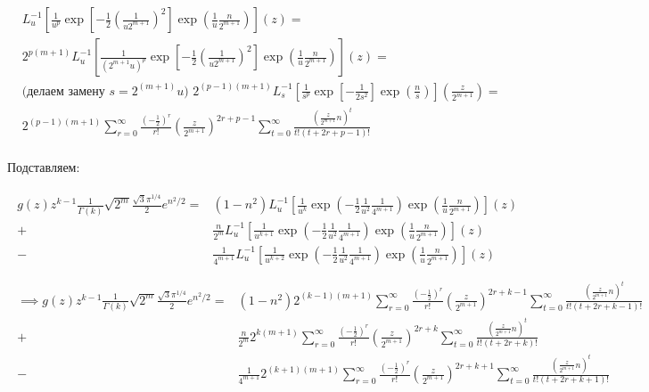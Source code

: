 \documentclass[a4paper, fleqn]{report}
\begin{document}
\begin{align*}
    & L^{-1}_u \left[ \frac{1}{u^p} \exp \left[ -\frac{1}{2} \left( \frac{1}{u 2^{m+1}} \right)^2  \right] \exp \left( \frac{1}{u} \frac{n}{2^{m+1}}\right)   \right](z) = \\
    & 2^{p(m+1)} L^{-1}_u \left[ \frac{1}{\left( 2^{m+1}u \right)^p} \exp \left[ -\frac{1}{2} \left( \frac{1}{u 2^{m+1}} \right)^2  \right] \exp \left( \frac{1}{u} \frac{n}{2^{m+1}}\right)   \right](z) = \\
    & \text{(делаем замену $s = 2^{(m+1)}u$) } 2^{(p-1)(m+1)} L^{-1}_s \left[ \frac{1}{s^p} \exp \left[ -\frac{1}{2 s^2} \right] \exp \left( \frac{n}{s} \right)  \right] \left(\frac{z}{2^{m+1}}\right) = \\
    & 2^{(p-1)(m+1)} \sum_{r=0}^{\infty} \frac{\left( -\frac{1}{2} \right)^r}{r!} \left(\frac{z}{2^{m+1}}\right)^{2r+p-1} \sum_{t=0}^{\infty} \frac{\left(\frac{z}{2^{m+1}}n\right)^{t}}{t!(t+2r+p-1)!} \\
\end{align*}

Подставляем:

\begin{align*}
\begin{split}
    g(z) z^{k-1} \frac{1}{\Gamma(k)} \sqrt{2^m} \frac{\sqrt{3} \pi^{1 /4}}{2} e^{n^2 /2} ={}& (1-n^2) L^{-1}_u \left[ \frac{1}{u^k} \exp \left( -\frac{1}{2} \frac{1}{u^2} \frac{1}{4^{m+1}} \right) \exp \left( \frac{1}{u} \frac{n}{2^{m+1}} \right)  \right](z) \\
    +{}& \frac{n}{2^m} L^{-1}_u \left[ \frac{1}{u^{k+1}} \exp \left( -\frac{1}{2} \frac{1}{u^2} \frac{1}{4^{m+1}} \right) \exp \left( \frac{1}{u} \frac{n}{2^{m+1}} \right)   \right](z) \\ 
    -{}& \frac{1}{4^{m+1}} L^{-1}_u \left[ \frac{1}{u^{k+2}} \exp \left( -\frac{1}{2} \frac{1}{u^2} \frac{1}{4^{m+1}} \right) \exp \left( \frac{1}{u} \frac{n}{2^{m+1}} \right)   \right](z) \\
\end{split} \\
\begin{split}
    \implies g(z) z^{k-1} \frac{1}{\Gamma(k)} \sqrt{2^m} \frac{\sqrt{3} \pi^{1 /4}}{2} e^{n^2 /2} 
    ={}& (1-n^2) 2^{(k-1)(m+1)} \sum_{r=0}^{\infty} \frac{\left( -\frac{1}{2} \right)^r}{r!} \left(\frac{z}{2^{m+1}}\right)^{2r+k-1} \sum_{t=0}^{\infty} \frac{\left(\frac{z}{2^{m+1}}n\right)^{t}}{t!(t+2r+k-1)!} \\
    +{}& \frac{n}{2^m} 2^{k(m+1)} \sum_{r=0}^{\infty} \frac{\left( -\frac{1}{2} \right)^r}{r!} \left(\frac{z}{2^{m+1}}\right)^{2r+k} \sum_{t=0}^{\infty} \frac{\left(\frac{z}{2^{m+1}}n\right)^{t}}{t!(t+2r+k)!} \\
    -{}& \frac{1}{4^{m+1}} 2^{(k+1)(m+1)} \sum_{r=0}^{\infty} \frac{\left( -\frac{1}{2} \right)^r}{r!} \left(\frac{z}{2^{m+1}}\right)^{2r+k+1} \sum_{t=0}^{\infty} \frac{\left(\frac{z}{2^{m+1}}n\right)^{t}}{t!(t+2r+k+1)!} \\
\end{split}
\end{align*}
\end{document}
